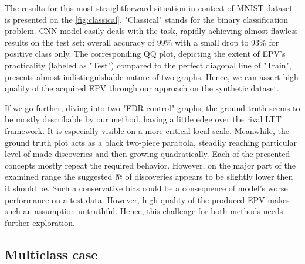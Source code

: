 \documentclass{article}
\begin{document}
The results for this most straightforward situation in context of MNIST dataset is presented on the \ref{fig:classical}. "Classical" stands for the binary classification problem. CNN model easily deals with the task, rapidly achieving almost flawless results on the test set: overall accuracy of 99\% with a small drop to 93\% for positive class only. The corresponding QQ plot, depicting the extent of EPV's practicality (labeled as "Test") compared to the perfect diagonal line of "Train", presents almost indistinguishable nature of two graphs. Hence, we can assert high quality of the acquired EPV through our approach on the synthetic dataset. 

If we go further, diving into two "FDR control" graphs, the ground truth seems to be mostly describable by our method, having a little edge over the rival LTT framework. It is especially visible on a more critical local scale. Meanwhile, the ground truth plot acts as a black two-piece parabola, steadily reaching particular level of made discoveries and then growing quadratically. Each of the presented concepts mostly repeat the required behavior. However, on the major part of the examined range the suggested № of discoveries appears to be slightly lower then it should be. Such a conservative bias could be a consequence of model's worse performance on a test data. However, high quality of the produced EPV makes such an assumption untruthful. Hence, this challenge for both methods needs further exploration.


\subsection{Multiclass case}
\end{document}
